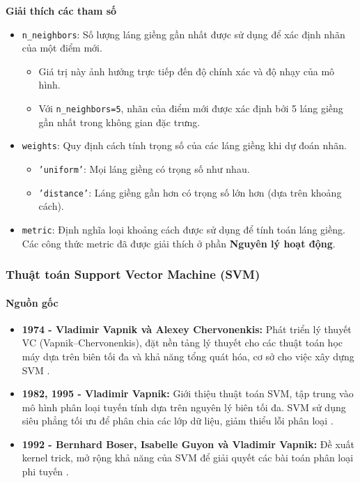\documentclass[a4paper,12pt]{article}
\begin{document}
\noindent \textbf{Giải thích các tham số}
\begin{itemize}
    \item \texttt{n\_neighbors}: Số lượng láng giềng gần nhất được sử dụng để xác định nhãn của một điểm mới.
    \begin{itemize}
        \item Giá trị này ảnh hưởng trực tiếp đến độ chính xác và độ nhạy của mô hình.
        \item Với \texttt{n\_neighbors=5}, nhãn của điểm mới được xác định bởi 5 láng giềng gần nhất trong không gian đặc trưng.
    \end{itemize}

    \item \texttt{weights}: Quy định cách tính trọng số của các láng giềng khi dự đoán nhãn.
    \begin{itemize}
        \item \texttt{'uniform'}: Mọi láng giềng có trọng số như nhau.
        \item \texttt{'distance'}: Láng giềng gần hơn có trọng số lớn hơn (dựa trên khoảng cách).
    \end{itemize}
    
    \item \texttt{metric}: Định nghĩa loại khoảng cách được sử dụng để tính toán láng giềng. Các công thức metric đã được giải thích ở phần \textbf{Nguyên lý hoạt động}.
\end{itemize}

\subsubsection{Thuật toán Support Vector Machine (SVM)}

\paragraph{Nguồn gốc}
\begin{itemize}
    \item \textbf{1974 - Vladimir Vapnik và Alexey Chervonenkis:} Phát triển lý thuyết VC (Vapnik–Chervonenkis), đặt nền tảng lý thuyết cho các thuật toán học máy dựa trên biên tối đa và khả năng tổng quát hóa, cơ sở cho việc xây dựng SVM \cite{vapnik1974}.
    \item \textbf{1982, 1995 - Vladimir Vapnik:} Giới thiệu thuật toán SVM, tập trung vào mô hình phân loại tuyến tính dựa trên nguyên lý biên tối đa. SVM sử dụng siêu phẳng tối ưu để phân chia các lớp dữ liệu, giảm thiểu lỗi phân loại \cite{vapnik1995}.
    \item \textbf{1992 - Bernhard Boser, Isabelle Guyon và Vladimir Vapnik:} Đề xuất kernel trick, mở rộng khả năng của SVM để giải quyết các bài toán phân loại phi tuyến \cite{boser1992}.
\end{itemize}
\end{document}
